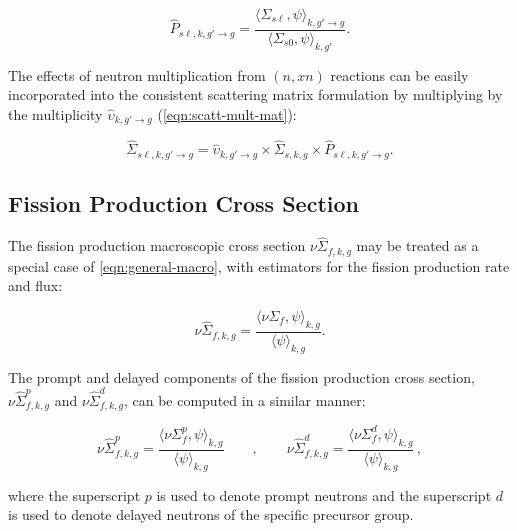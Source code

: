 \begin{equation}
\label{eqn:scatt-prob-mat}
\hat{P}_{s\ell,k,g'\rightarrow g} = \frac{{\langle \Sigma_{s\ell}, \psi \rangle}_{k,g'\rightarrow g}}{{\langle \Sigma_{s0}, \psi \rangle}_{k,g'}}.
\end{equation}

The effects of neutron multiplication from $(n,xn)$ reactions can be easily incorporated into the consistent scattering matrix formulation by multiplying by the multiplicity $\hat{\upsilon}_{k,g'\rightarrow g}$ (\cref{eqn:scatt-mult-mat}):

\begin{equation}
\label{eqn:nuscatt-mat-consistent}
\hat{\Sigma}_{s\ell,k,g'\rightarrow g} = \hat{\upsilon}_{k,g'\rightarrow g} \times \hat{\Sigma}_{s,k,g} \times \hat{P}_{s\ell,k,g'\rightarrow g}.
\end{equation}

\subsection{Fission Production Cross Section}
\label{subsubsec:tally-types-fiss-prod}

The fission production macroscopic cross section $\nu\hat{\Sigma}_{f,k,g}$ may be treated as a special case of \cref{eqn:general-macro}, with estimators for the fission production rate and flux:

\begin{equation}
\label{eqn:nu-fiss-macro}
\nu\hat{\Sigma}_{f,k,g} = \frac{\langle \nu\Sigma_{f}, \psi \rangle_{k,g}}{\langle \psi \rangle_{k,g}}.
\end{equation}

\noindent The prompt and delayed components of the fission production cross section, $\nu\hat{\Sigma}_{f,k,g}^{p}$ and $\nu\hat{\Sigma}_{f,k,g}^{d}$, can be computed in a similar manner:

\begin{equation}
\label{eqn:nu-fiss-macro-specific}
\nu\hat{\Sigma}_{f,k,g}^{p} = \frac{\langle \nu\Sigma_{f}^{p}, \psi \rangle_{k,g}}{\langle \psi \rangle_{k,g}} \qquad , \qquad \nu\hat{\Sigma}_{f,k,g}^{d} = \frac{\langle \nu\Sigma_{f}^{d}, \psi \rangle_{k,g}}{\langle \psi \rangle_{k,g}}\,,
\end{equation}

\noindent where the superscript $p$ is used to denote prompt neutrons and the superscript $d$ is used to denote delayed neutrons of the specific precursor group.


